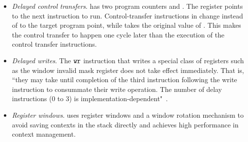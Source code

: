 \begin{itemize}
	\item \textit{Delayed control transfers}.
	\sparc{} has two program counters \pc{} and \npc.
    The \npc{} register points to the next instruction
    to run.
	Control-transfer instructions in \sparc{}
	change \npc{} instead of \pc{} to the target program point,
    while \pc{} takes the original value of \npc.
	This makes the control transfer to happen one cycle later
    than the execution of the control transfer instructions.
	
	\item \textit{Delayed writes}.
	The $\texttt{wr}$ instruction that writes a special class
    of registers such as the window invalid mask register
    \regwim{} does not take effect immediately.
    That is, ``they may take until
    completion of the third instruction following the write
    instruction to consummate their write operation.
    The number of delay instructions (0 to 3)
    is implementation-dependent"~\cite{sparc}.


	\item \textit{Register windows}.
	\sparc{} uses register windows
	and a window rotation mechanism
	to avoid saving contexts in the stack directly
    and achieves high performance in context management.
\end{itemize}

